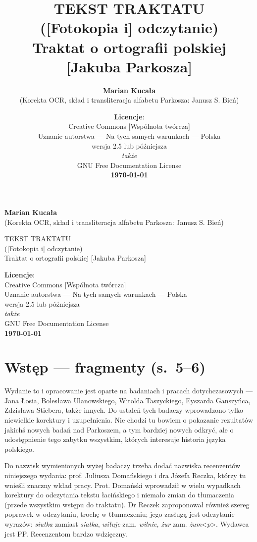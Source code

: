 \documentclass[dvipsnames,12pt]{report}
\author{\textbf{Marian Kucała}\\(Korekta OCR, skład i transliteracja alfabetu Parkosza: Janusz S. Bień)}
\title{TEKST TRAKTATU\\[-.5ex]([Fotokopia i] odczytanie)\\[-.5ex]Traktat o ortografii polskiej [Jakuba Parkosza]}
\date{\textbf{Licencje}:\\ \relsize{-1}Creative Commons [Wspólnota twórcza]\\[-.4ex]
Uznanie autorstwa --- Na tych samych warunkach --- Polska\\
wersja 2.5 lub późniejsza\\\textit{także}\\
GNU Free Documentation License\\
\textbf{\today}}
\begin{document}
\thispagestyle{empty}

\begin{titlepage}
{\textbf{Marian Kucała}\\(Korekta OCR, skład i transliteracja alfabetu Parkosza: Janusz S. Bień)} 

\vfill
{
{TEKST TRAKTATU\\[-.5ex]([Fotokopia i] odczytanie)\\[-.5ex]Traktat o ortografii polskiej [Jakuba Parkosza]}}

\vfill
{\textbf{Licencje}:\\ Creative Commons [Wspólnota twórcza]\\[-.4ex]
Uznanie autorstwa --- Na tych samych warunkach --- Polska\\
wersja 2.5 lub późniejsza\\\textit{także}\\
GNU Free Documentation License\\
\textbf{\today}}

\end{titlepage}

{}



\raggedright

\section*{Wstęp --- fragmenty (s.~5--6)}
\label{sec:wstp}
Wydanie to i opracowanie jest oparte na badaniach i pracach
dotychczasowych — Jana Łosia, Bolesława Ulanowskiego, Witolda
Taszyckiego, Eyszarda Ganszyńca, Zdzisława Stiebera, także innych. Do
ustaleń tych badaczy wprowadzono tylko niewielkie korektury i
uzupełnienia. Nie chodzi tu bowiem o pokazanie rezultatów jakichś
nowych badań nad Parkoszem, a tym bardziej nowych odkryć, ale o
udostępnienie tego zabytku wszystkim, których interesuje historia
języka polskiego.

Do nazwisk wymienionych wyżej badaczy trzeba dodać nazwiska
recenzentów niniejszego wydania: prof. Juliusza Domańskiego i dra
Józefa Reczka, którzy tu wnieśli znaczny wkład pracy. Prot. Domański
wprowadził w wielu wypadkach korektury do odczytania tekstu
łacińskiego i niemało zmian do tłumaczenia (przede wszystkim wstępu do
traktatu). Dr Reczek zaproponował również szereg poprawek w
odczytaniu,
trochę w tłumaczeniu; jego zasługą jest odczytanie wyrazów:
\textit{siutka} zamiast \textit{siatka}, \textit{wiłuje}
zam. \textit{wilnie}, \textit{żur} zam. \textit{żum}<\textit{p}>.
Wydawca jest PP. Recenzentom bardzo wdzięczny.
\end{document}
